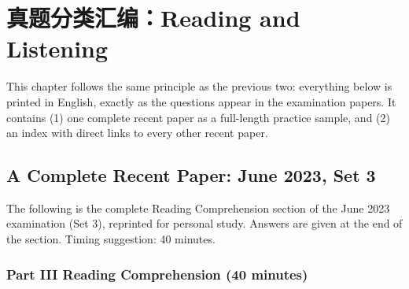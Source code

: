 \section{真题分类汇编：Reading and Listening}

This chapter follows the same principle as the previous two: everything below is printed in English, exactly as the questions appear in the examination papers. It contains (1) one complete recent paper as a full-length practice sample, and (2) an index with direct links to every other recent paper.

\subsection{A Complete Recent Paper: June 2023, Set 3}

The following is the complete Reading Comprehension section of the June 2023 examination (Set 3), reprinted for personal study. Answers are given at the end of the section. Timing suggestion: 40 minutes.

\subsubsection*{Part III \quad Reading Comprehension (40 minutes)}

